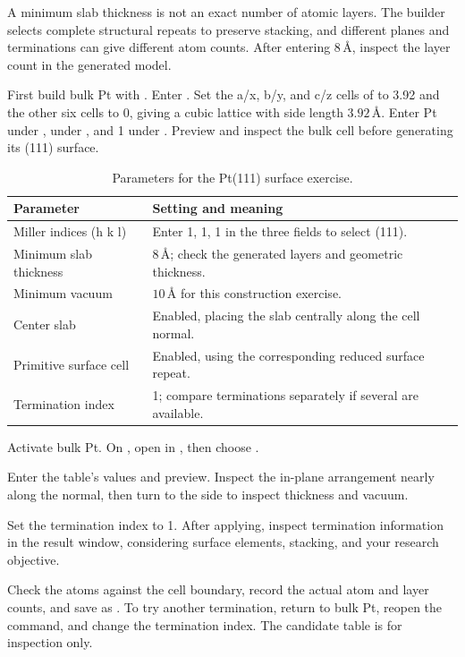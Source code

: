 

A minimum slab thickness is not an exact number of atomic layers. The builder selects complete structural repeats to preserve stacking, and different planes and terminations can give different atom counts. After entering $8\,\text{\AA}$, inspect the layer count in the generated model.

First build bulk Pt with . Enter . Set the a/x, b/y, and c/z cells of  to 3.92 and the other six cells to 0, giving a cubic lattice with side length $3.92\,\text{\AA}$. Enter Pt under ,  under , and 1 under . Preview and inspect the bulk cell before generating its (111) surface.

\begin{table}[htbp]
\centering
\caption{Parameters for the Pt(111) surface exercise.}
\begin{tabularx}{\linewidth}{lX}
\toprule
Parameter & Setting and meaning \\
\midrule
Miller indices (h k l) & Enter 1, 1, 1 in the three fields to select (111).\\
Minimum slab thickness & $8\,\text{\AA}$; check the generated layers and geometric thickness.\\
Minimum vacuum & $10\,\text{\AA}$ for this construction exercise.\\
Center slab & Enabled, placing the slab centrally along the cell normal.\\
Primitive surface cell & Enabled, using the corresponding reduced surface repeat.\\
Termination index & 1; compare terminations separately if several are available.\\
\bottomrule
\end{tabularx}
\end{table}

\begin{steps}
  \item Activate bulk Pt. On , open  in , then choose .
  \item Enter the table's values and preview. Inspect the in-plane arrangement nearly along the normal, then turn to the side to inspect thickness and vacuum.
  \item Set the termination index to 1. After applying, inspect termination information in the result window, considering surface elements, stacking, and your research objective.
  \item Check the atoms against the cell boundary, record the actual atom and layer counts, and save as . To try another termination, return to bulk Pt, reopen the command, and change the termination index. The candidate table is for inspection only.
\end{steps}

